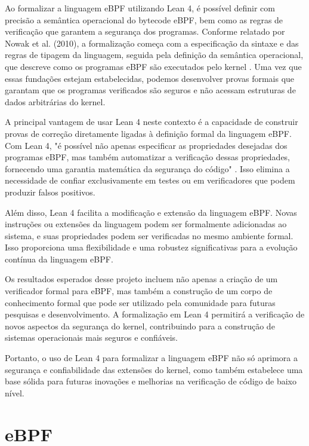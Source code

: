 \documentclass[sigconf]{acmart}
\begin{document}
Ao formalizar a linguagem eBPF utilizando Lean 4, é possível definir com precisão a semântica operacional do bytecode eBPF, bem como as regras de verificação que garantem a segurança dos programas. Conforme relatado por Nowak et al. (2010), a formalização começa com a especificação da sintaxe e das regras de tipagem da linguagem, seguida pela definição da semântica operacional, que descreve como os programas eBPF são executados pelo kernel \cite{page2005engineering}. Uma vez que essas fundações estejam estabelecidas, podemos desenvolver provas formais que garantam que os programas verificados são seguros e não acessam estruturas de dados arbitrárias do kernel.

A principal vantagem de usar Lean 4 neste contexto é a capacidade de construir provas de correção diretamente ligadas à definição formal da linguagem eBPF. Com Lean 4, "é possível não apenas especificar as propriedades desejadas dos programas eBPF, mas também automatizar a verificação dessas propriedades, fornecendo uma garantia matemática da segurança do código" \cite{de2015lean}. Isso elimina a necessidade de confiar exclusivamente em testes ou em verificadores que podem produzir falsos positivos.

Além disso, Lean 4 facilita a modificação e extensão da linguagem eBPF. Novas instruções ou extensões da linguagem podem ser formalmente adicionadas ao sistema, e suas propriedades podem ser verificadas no mesmo ambiente formal. Isso proporciona uma flexibilidade e uma robustez significativas para a evolução contínua da linguagem eBPF.

Os resultados esperados desse projeto incluem não apenas a criação de um verificador formal para eBPF, mas também a construção de um corpo de conhecimento formal que pode ser utilizado pela comunidade para futuras pesquisas e desenvolvimento. A formalização em Lean 4 permitirá a verificação de novos aspectos da segurança do kernel, contribuindo para a construção de sistemas operacionais mais seguros e confiáveis.

Portanto, o uso de Lean 4 para formalizar a linguagem eBPF não só aprimora a segurança e confiabilidade das extensões do kernel, como também estabelece uma base sólida para futuras inovações e melhorias na verificação de código de baixo nível.

\section{eBPF}
\end{document}
